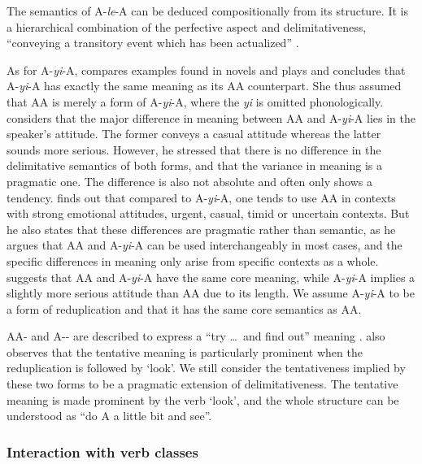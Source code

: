 The semantics of A-\textit{le}-A can be deduced compositionally from its structure. 
It is a hierarchical combination of the perfective aspect and delimitativeness, ``conveying a transitory event which has been actualized'' \citep[151]{XiaoMcEnery2004}.


As for A-\textit{yi}-A, \citet[273]{Fan1964} compares examples found in novels and plays and concludes that A-\textit{yi}-A has exactly the same meaning as its AA counterpart.
She thus assumed that AA is merely a form of A-\textit{yi}-A, where the \textit{yi} is omitted phonologically.
\citet[Sec. 5]{Xing2000} considers that the major  difference in meaning  between AA and A-\textit{yi}-A lies in the speaker's attitude.
The former conveys a casual attitude whereas the latter sounds more serious.%
However, he stressed that there is no difference in the delimitative semantics of both forms,
and that the variance in meaning is a pragmatic one.
The difference is also not absolute and often only shows a tendency.
\citet{Xu2002} finds out that compared to A-\textit{yi}-A, one tends to use AA in contexts with strong emotional attitudes, urgent, casual, timid or uncertain contexts.
But he also states that these differences are pragmatic rather than semantic, 
as he argues that AA and A-\textit{yi}-A can be used interchangeably in most cases,
and the specific differences in meaning only arise from specific contexts as a whole.
\citet[15]{Yang2003} suggests that AA and A-\textit{yi}-A have the same core meaning, while A-\textit{yi}-A implies a slightly more serious attitude than AA due to its length.
We assume A-\textit{yi}-A to be a form of reduplication and that it has the same core semantics as AA.

AA- and A-- are described to express a ``try \ldots\, and find out'' meaning \citep[63]{Cheng2012}.
\citet[290]{Tsao2001} also observes that the tentative meaning is particularly prominent when the reduplication is followed by  `look'.
We still consider the tentativeness implied by these two forms to be a pragmatic extension of delimitativeness.
The tentative meaning is made prominent by the verb  `look',
and the whole structure can be understood as ``do A a little bit and see''.




\subsubsection{Interaction with verb classes}\label{sec:Aktionsarten}


